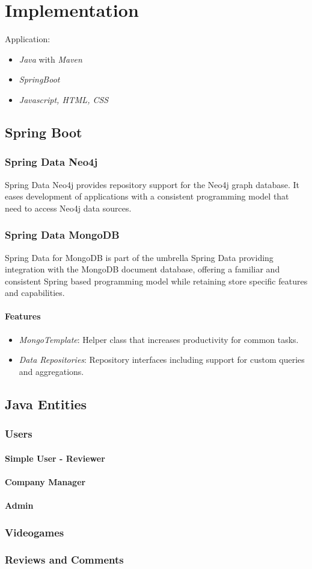\chapter{Implementation}
Application: 
\begin{itemize}
	\item \emph{Java} with \emph{Maven} 
	\item \emph{SpringBoot}
	\item \emph{Javascript, HTML, CSS} 
\end{itemize}
\section{Spring Boot}
\subsection{Spring Data Neo4j}
Spring Data Neo4j provides repository support for the Neo4j graph database. It eases development of applications with a consistent programming model that need to access Neo4j data sources.
\subsection{Spring Data MongoDB}
Spring Data for MongoDB is part of the umbrella Spring Data providing integration with the MongoDB document database, offering a familiar and consistent Spring based programming model while retaining store specific features and capabilities.
\subsubsection{Features}
\begin{itemize}
	\item \emph{MongoTemplate}: Helper class that increases productivity for common tasks.
	\item \emph{Data Repositories}: Repository interfaces including support for custom queries and aggregations.
\end{itemize}
\section{Java Entities}
\subsection{Users}
\subsubsection{Simple User - Reviewer}
\subsubsection{Company Manager}
\subsubsection{Admin}
\subsection{Videogames}
\subsection{Reviews and Comments}

